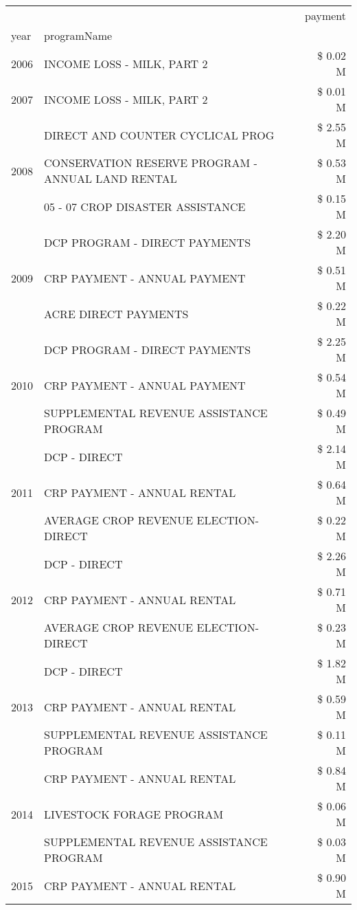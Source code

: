 \begin{tabular}{llr}
\toprule
 &  & payment \\
year & programName &  \\
\midrule
2006 & INCOME LOSS - MILK, PART 2 & \$ 0.02 M \\
\cline{1-3}
2007 & INCOME LOSS - MILK, PART 2 & \$ 0.01 M \\
\cline{1-3}
\multirow[t]{3}{*}{2008} & DIRECT AND COUNTER CYCLICAL PROG & \$ 2.55 M \\
 & CONSERVATION RESERVE PROGRAM - ANNUAL LAND RENTAL & \$ 0.53 M \\
 & 05 - 07 CROP DISASTER ASSISTANCE & \$ 0.15 M \\
\cline{1-3}
\multirow[t]{3}{*}{2009} & DCP PROGRAM - DIRECT PAYMENTS & \$ 2.20 M \\
 & CRP PAYMENT - ANNUAL PAYMENT & \$ 0.51 M \\
 & ACRE DIRECT PAYMENTS & \$ 0.22 M \\
\cline{1-3}
\multirow[t]{3}{*}{2010} & DCP PROGRAM - DIRECT PAYMENTS & \$ 2.25 M \\
 & CRP PAYMENT - ANNUAL PAYMENT & \$ 0.54 M \\
 & SUPPLEMENTAL REVENUE ASSISTANCE PROGRAM & \$ 0.49 M \\
\cline{1-3}
\multirow[t]{3}{*}{2011} & DCP - DIRECT & \$ 2.14 M \\
 & CRP PAYMENT - ANNUAL RENTAL & \$ 0.64 M \\
 & AVERAGE CROP REVENUE ELECTION-DIRECT & \$ 0.22 M \\
\cline{1-3}
\multirow[t]{3}{*}{2012} & DCP - DIRECT & \$ 2.26 M \\
 & CRP PAYMENT - ANNUAL RENTAL & \$ 0.71 M \\
 & AVERAGE CROP REVENUE ELECTION-DIRECT & \$ 0.23 M \\
\cline{1-3}
\multirow[t]{3}{*}{2013} & DCP - DIRECT & \$ 1.82 M \\
 & CRP PAYMENT - ANNUAL RENTAL & \$ 0.59 M \\
 & SUPPLEMENTAL REVENUE ASSISTANCE PROGRAM & \$ 0.11 M \\
\cline{1-3}
\multirow[t]{3}{*}{2014} & CRP PAYMENT - ANNUAL RENTAL & \$ 0.84 M \\
 & LIVESTOCK FORAGE PROGRAM & \$ 0.06 M \\
 & SUPPLEMENTAL REVENUE ASSISTANCE PROGRAM & \$ 0.03 M \\
\cline{1-3}
\multirow[t]{3}{*}{2015} & CRP PAYMENT - ANNUAL RENTAL & \$ 0.90 M \\

\end{tabular}
